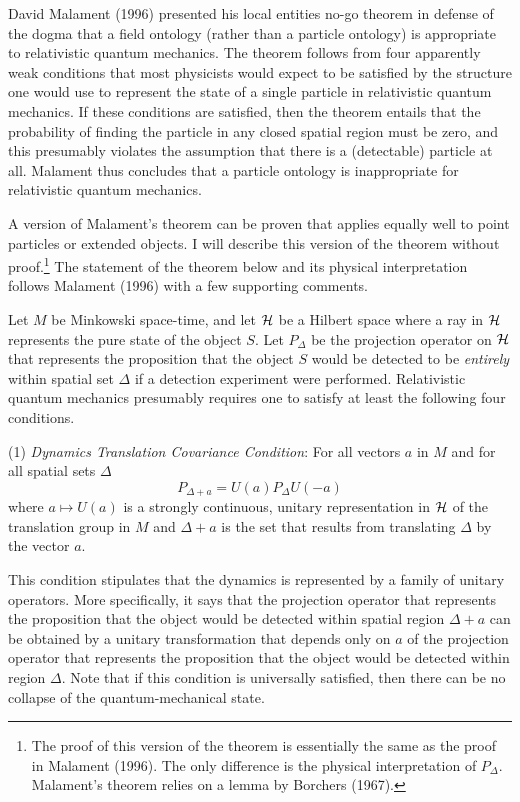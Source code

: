 \documentclass [12pt]{article}
\begin{document}
David Malament (1996) presented his local entities no-go theorem in defense
of the dogma that  a field ontology (rather than a particle ontology) is
appropriate to relativistic quantum mechanics.  The theorem follows from four
apparently weak conditions that most physicists would expect to be satisfied
by the structure one would use to represent the state of a single particle
in relativistic quantum mechanics.  If these conditions are satisfied, then the
theorem entails that the probability of finding the particle
in any closed spatial region must be zero, and this presumably violates
the assumption that there is a (detectable) particle at all.  Malament thus concludes that
a particle ontology is inappropriate for relativistic quantum mechanics.

A version of Malament's theorem can be proven that applies equally well
to point particles or extended objects.  I will describe this version
of the theorem without proof.\footnote{The proof of this version of the theorem
is essentially the same as the proof in Malament (1996).  The only difference
is the physical interpretation of $P_\Delta$.  Malament's theorem relies
on a lemma by Borchers (1967).}  The statement of the theorem below
and its physical interpretation follows Malament (1996) with a few supporting
comments.


Let $M$ be Minkowski space-time, and let ${\cal H}$ be a Hilbert space where a ray in
${\cal H}$ represents the pure state of the object $S$.  Let $P_\Delta$ be the projection
operator on ${\cal H}$ that represents the proposition that the object $S$ would be
detected to be {\em entirely\/} within spatial set $\Delta$ if a detection experiment were performed.
Relativistic quantum mechanics presumably requires one to satisfy at least
the following four conditions.

(1)  {\em Dynamics Translation Covariance Condition}:  For all
vectors $a$ in $M$ and for all spatial sets $\Delta$
\begin{equation}
P_{\Delta+a}= U(a)P_\Delta U(-a)
\end{equation}
where $a \mapsto U(a)$ is a strongly continuous, unitary representation in ${\cal H}$
of the translation group in $M$ and $\Delta+a$ is the set that results
from translating $\Delta$ by the vector $a$.

This condition stipulates that the dynamics is represented by a family of unitary
operators.  More specifically, it says that
the projection operator that represents the proposition that the object would be
detected within spatial region $\Delta+a$ can be obtained by a unitary transformation that
depends only on $a$ of the projection operator that represents the proposition that the
object would be detected within region $\Delta$.  Note that if this condition is universally
satisfied, then there can be no collapse of the quantum-mechanical state.
\end{document}
